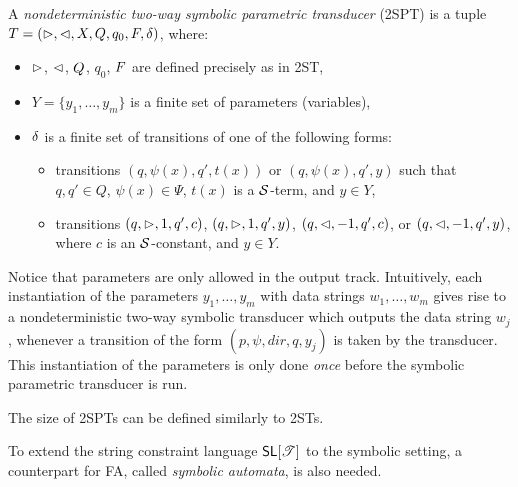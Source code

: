 

\begin{definition}
A \emph{nondeterministic two-way symbolic parametric transducer} (2SPT) is a tuple
$T=(\vartriangleright, \vartriangleleft, X, Q, q_0, F, \delta)$, where:
\begin{itemize}
%
\item $\vartriangleright$, $\vartriangleleft$, $Q$, $q_0$, $F$ are defined precisely as in 2ST, 
%
\item $Y=\{y_1,\ldots, y_m\}$ is a finite set of parameters (variables), 
%
\item $\delta$ is a finite set of transitions of one of the following forms: 
\begin{itemize}
\item transitions $(q, \psi(x), q', t(x))$ or $(q, \psi(x), q', y)$ such that $q,q' \in Q$, $\psi(x) \in \Psi$,
$t(x)$ is a $\mathcal{S}$-term, and $y \in Y$,
%
\item transitions $(q, \vartriangleright, 1, q', c)$, $(q, \vartriangleright, 1, q', y)$, $(q, \vartriangleleft, -1, q', c)$,  or $(q, \vartriangleleft, -1, q', y)$, where $c$ is an $\mathcal{S}$-constant, and $y \in Y$. 
\end{itemize}
\end{itemize}
\end{definition}

Notice that parameters are only allowed in the output track.
Intuitively, each instantiation of the parameters $y_1,\ldots, y_m$ with data strings 
$w_1,\ldots, w_m$ gives rise to a nondeterministic two-way symbolic transducer which outputs
the data string $w_j$, whenever a transition of the form $(p, \psi, dir, q, y_j)$ is
taken by the transducer. This instantiation of the parameters is only done 
\emph{once} before the symbolic parametric transducer is run.

The size of 2SPTs can be defined similarly to 2STs. 

To extend the string constraint language $\textsf{SL}[\mathscr{T}]$ to the symbolic setting, a counterpart for FA, called \emph{symbolic automata}, is also needed. 

